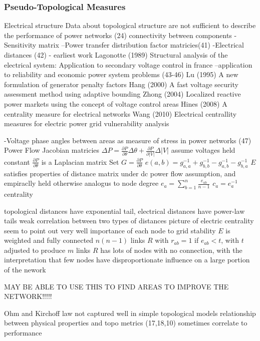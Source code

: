 
\subsubsection{Pseudo-Topological Measures}

Electrical structure
Data about topological structure are not sufficient to describe the performance of power networks (24)
connectivity between components
-Sensitivity matrix
--Power transfer distribution factor matricies(41)
-Electrical distances (42) - earliest work
Lagonotte (1989) Structural analysis of the electrical system: Application to secondary voltage control in france
--application to reliability and economic power system problems (43-46)
Lu (1995) A new formulation of generator penalty factors
Hang (2000) A fast voltage security assessment method using adaptive bounding
Zhong (2004) Localized reactive power markets using the concept of voltage control areas
Hines (2008) A centrality measure for electrical networks
Wang (2010) Electrical centrallity measures for electric power grid vulnerability analysis

-Voltage phase angles between areas as measure of stress in power networks (47)
Power Flow Jacobian matricies
$ \Delta P = \frac{ \partial P }{ \partial \theta} \Delta \theta + \frac{ \partial P }{ \partial | V | } \Delta | V |$
assume voltages held constant
$\frac{ \partial P }{ \partial \theta} $ is a Laplacian matrix
Set $G = \frac{ \partial P }{ \partial \theta} $
$e(a,b) = g_{a,a}^{-1} + g_{b,b}^{-1} - g_{a,b}^{-1} - g_{b,a}^{-1}$
$E$ satisfies properties of distance matrix under dc power flow assumption, and empiraclly held otherwise
analogus to node degree
$e_a = \sum_{b=1}^n \frac{e_{ab}}{n-1}$
$c_a = e_a^{-1}$ centrality

topological distances have exponential tail, electrical distances have power-law tails
weak correlation between two types of distances
picture of electric centrality seem to point out very well importance of each node to grid stability
$E$ is weighted and fully connected $n(n-1)$ links
$R$ with $r_{ab} = 1 $ if $e_{ab} < t$, with $t $ adjusted to produce $m$ links
$R$ has lots of nodes with no connection, with the interpretation that few nodes have disproportionate influence on a large portion of the nework

MAY BE ABLE TO USE THIS TO FIND AREAS TO IMPROVE THE NETWORK!!!!!




Ohm and Kirchoff law not captured well in simple topological models
relationship between physical properties and topo metrics (17,18,10) sometimes correlate to performance

